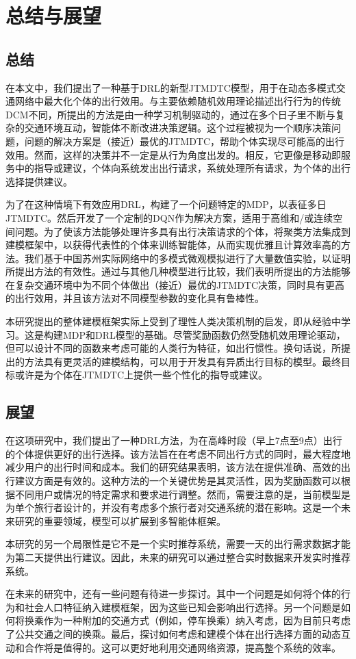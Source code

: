 \chapter{总结与展望}
\label{chp:version_license}

\section{总结}

在本文中，我们提出了一种基于DRL的新型JTMDTC模型，用于在动态多模式交通网络中最大化个体的出行效用。与主要依赖随机效用理论描述出行行为的传统DCM不同，所提出的方法是由一种学习机制驱动的，通过在多个日子里不断与复杂的交通环境互动，智能体不断改进决策逻辑。这个过程被视为一个顺序决策问题，问题的解决方案是（接近）最优的JTMDTC，帮助个体实现尽可能高的出行效用。然而，这样的决策并不一定是从行为角度出发的。相反，它更像是移动即服务中的指导或建议，个体向系统发出出行请求，系统处理所有请求，为个体的出行选择提供建议。

为了在这种情境下有效应用DRL，构建了一个问题特定的MDP，以表征多日JTMDTC。然后开发了一个定制的DQN作为解决方案，适用于高维和/或连续空间问题。为了使该方法能够处理许多具有出行决策请求的个体，将聚类方法集成到建模框架中，以获得代表性的个体来训练智能体，从而实现优雅且计算效率高的方法。我们基于中国苏州实际网络中的多模式微观模拟进行了大量数值实验，以证明所提出方法的有效性。通过与其他几种模型进行比较，我们表明所提出的方法能够在复杂交通环境中为不同个体做出（接近）最优的JTMDTC决策，同时具有更高的出行效用，并且该方法对不同模型参数的变化具有鲁棒性。

本研究提出的整体建模框架实际上受到了理性人类决策机制的启发，即从经验中学习。这是构建MDP和DRL模型的基础。尽管奖励函数仍然受随机效用理论驱动，但可以设计不同的函数来考虑可能的人类行为特征，如出行惯性。换句话说，所提出的方法具有更灵活的建模结构，可以用于开发具有异质出行目标的模型。最终目标或许是为个体在JTMDTC上提供一些个性化的指导或建议。

\section{展望}

在这项研究中，我们提出了一种DRL方法，为在高峰时段（早上7点至9点）出行的个体提供更好的出行选择。该方法旨在在考虑不同出行方式的同时，最大程度地减少用户的出行时间和成本。我们的研究结果表明，该方法在提供准确、高效的出行建议方面是有效的。这种方法的一个关键优势是其灵活性，因为奖励函数可以根据不同用户或情况的特定需求和要求进行调整。然而，需要注意的是，当前模型是为单个旅行者设计的，并没有考虑多个旅行者对交通系统的潜在影响。这是一个未来研究的重要领域，模型可以扩展到多智能体框架。

本研究的另一个局限性是它不是一个实时推荐系统，需要一天的出行需求数据才能为第二天提供出行建议。因此，未来的研究可以通过整合实时数据来开发实时推荐系统。

在未来的研究中，还有一些问题有待进一步探讨。其中一个问题是如何将个体的行为和社会人口特征纳入建模框架，因为这些已知会影响出行选择。另一个问题是如何将换乘作为一种附加的交通方式（例如，停车换乘）纳入考虑，因为目前只考虑了公共交通之间的换乘。最后，探讨如何考虑和建模个体在出行选择方面的动态互动和合作将是值得的。这可以更好地利用交通网络资源，提高整个系统的效率。